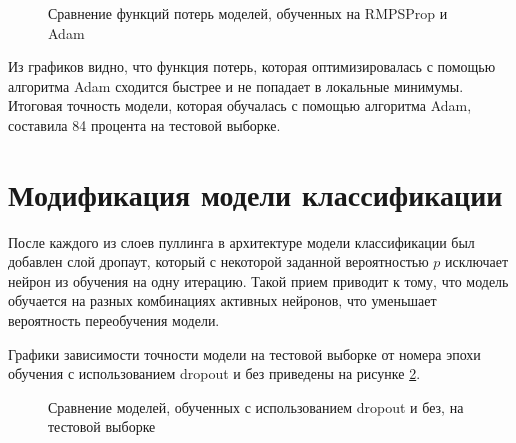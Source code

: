\begin{figure}[H]
	\begin{center}
		\caption{Сравнение функций потерь моделей, обученных на RMPSProp и Adam}
		\label{img:adam_rmsprops_test}
	\end{center}
\end{figure}

Из графиков видно, что функция потерь, которая оптимизировалась с помощью алгоритма Adam сходится быстрее и не попадает в локальные минимумы. Итоговая точность модели, которая обучалась с помощью алгоритма Adam, составила 84 процента на тестовой выборке.

\section{Модификация модели классификации}

После каждого из слоев пуллинга в архитектуре модели классификации был добавлен слой дропаут, который с некоторой заданной вероятностью $p$ исключает нейрон из обучения на одну итерацию. Такой прием приводит к тому, что модель обучается на разных комбинациях активных нейронов, что уменьшает вероятность переобучения модели.

Графики зависимости точности модели на тестовой выборке от номера эпохи обучения с использованием dropout и без приведены на рисунке \ref{img:dropout_test}.

\begin{figure}[H]
	\begin{center}
		\caption{Сравнение моделей, обученных с использованием dropout и без, на тестовой выборке}
		\label{img:dropout_test}
	\end{center}
\end{figure}

